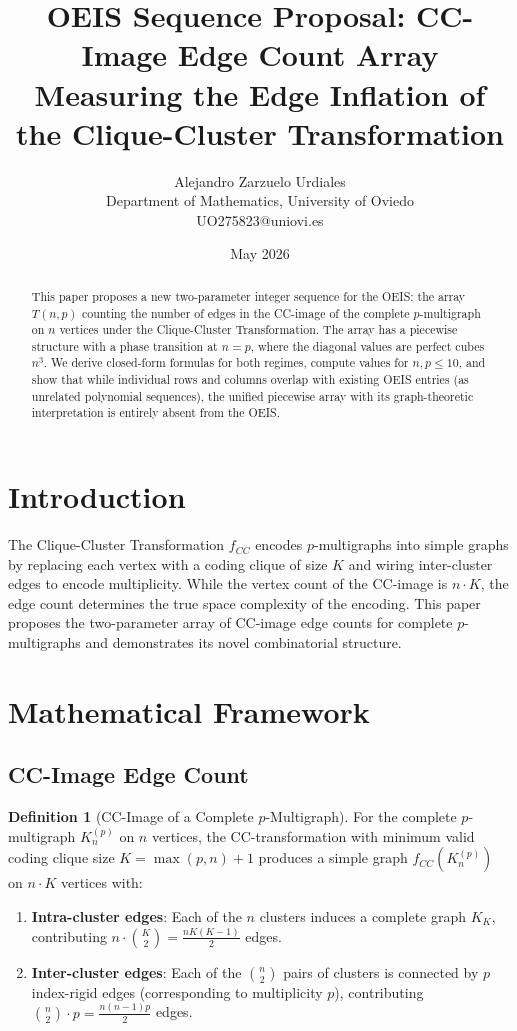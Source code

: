 \documentclass[11pt,a4paper]{article}
\title{OEIS Sequence Proposal: CC-Image Edge Count Array\\
\large Measuring the Edge Inflation of the Clique-Cluster Transformation}
\author{Alejandro Zarzuelo Urdiales\\
Department of Mathematics, University of Oviedo\\
UO275823@uniovi.es}
\date{May 2026}
\theoremstyle{definition}
\newtheorem{definition}{Definition}[section]
\begin{document}
\maketitle

\begin{abstract}
This paper proposes a new two-parameter integer sequence for the OEIS: the array $T(n, p)$ counting the number of edges in the CC-image of the complete $p$-multigraph on $n$ vertices under the Clique-Cluster Transformation. The array has a piecewise structure with a phase transition at $n = p$, where the diagonal values are perfect cubes $n^3$. We derive closed-form formulas for both regimes, compute values for $n, p \leq 10$, and show that while individual rows and columns overlap with existing OEIS entries (as unrelated polynomial sequences), the unified piecewise array with its graph-theoretic interpretation is entirely absent from the OEIS.
\end{abstract}

\section{Introduction}

The Clique-Cluster Transformation $f_{CC}$ \cite{zarzuelo2025} encodes $p$-multigraphs into simple graphs by replacing each vertex with a coding clique of size $K$ and wiring inter-cluster edges to encode multiplicity. While the vertex count of the CC-image is $n \cdot K$, the edge count determines the true space complexity of the encoding. This paper proposes the two-parameter array of CC-image edge counts for complete $p$-multigraphs and demonstrates its novel combinatorial structure.

\section{Mathematical Framework}

\subsection{CC-Image Edge Count}

\begin{definition}[CC-Image of a Complete $p$-Multigraph]
For the complete $p$-multigraph $K_n^{(p)}$ on $n$ vertices, the CC-transformation with minimum valid coding clique size $K = \max(p, n) + 1$ produces a simple graph $f_{CC}(K_n^{(p)})$ on $n \cdot K$ vertices with:
\begin{enumerate}
\item \textbf{Intra-cluster edges}: Each of the $n$ clusters induces a complete graph $K_K$, contributing $n \cdot \binom{K}{2} = \frac{nK(K-1)}{2}$ edges.
\item \textbf{Inter-cluster edges}: Each of the $\binom{n}{2}$ pairs of clusters is connected by $p$ index-rigid edges (corresponding to multiplicity $p$), contributing $\binom{n}{2} \cdot p = \frac{n(n-1)p}{2}$ edges.
\end{enumerate}
\end{definition}
\end{document}
